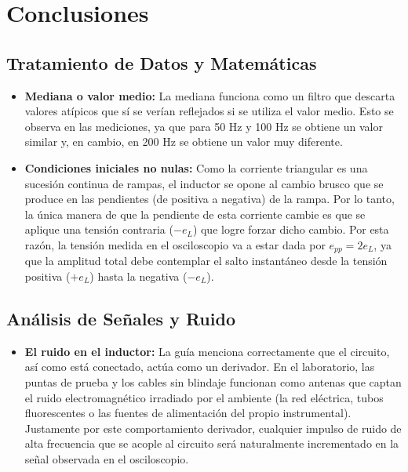 \section{Conclusiones}

\subsection{Tratamiento de Datos y Matemáticas}

\begin{itemize}
	\item \textbf{Mediana o valor medio:} La mediana funciona como un filtro que descarta valores atípicos que sí se verían reflejados si se utiliza el valor medio. Esto se observa en las mediciones, ya que para 50 Hz y 100 Hz se obtiene un valor similar y, en cambio, en 200 Hz se obtiene un valor muy diferente.
	\item \textbf{Condiciones iniciales no nulas:} Como la corriente triangular es una sucesión continua de rampas, el inductor se opone al cambio brusco que se produce en las pendientes (de positiva a negativa) de la rampa. Por lo tanto, la única manera de que la pendiente de esta corriente cambie es que se aplique una tensión contraria ($-e_L$) que logre forzar dicho cambio. Por esta razón, la tensión medida en el osciloscopio va a estar dada por $e_{pp} = 2 e_L$, ya que la amplitud total debe contemplar el salto instantáneo desde la tensión positiva ($+e_L$) hasta la negativa ($-e_L$).
\end{itemize}


\subsection{Análisis de Señales y Ruido}


\begin{itemize}
\item \textbf{El ruido en el inductor:} La guía menciona correctamente que el circuito, así como está conectado, actúa como un derivador. En el laboratorio, las puntas de prueba y los cables sin blindaje funcionan como antenas que captan el ruido electromagnético irradiado por el ambiente (la red eléctrica, tubos fluorescentes o las fuentes de alimentación del propio instrumental). Justamente por este comportamiento derivador, cualquier impulso de ruido de alta frecuencia que se acople al circuito será naturalmente incrementado en la señal observada en el osciloscopio.
\end{itemize}

